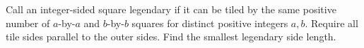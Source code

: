 Call an integer-sided square legendary if it can be tiled by the same positive number of $a$-by-$a$ and $b$-by-$b$ squares for distinct positive integers $a,b$. Require all tile sides parallel to the outer sides. Find the smallest legendary side length.
